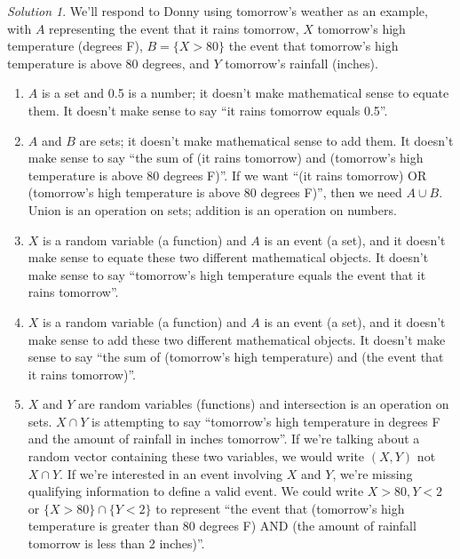 \documentclass[
  letterpaper,
  DIV=11,
  numbers=noendperiod]{scrreprt}
\providecommand{\tightlist}{%
  \setlength{\itemsep}{0pt}\setlength{\parskip}{0pt}}
\theoremstyle{plain}
\theoremstyle{definition}
\theoremstyle{definition}
\theoremstyle{definition}
\theoremstyle{remark}
\newtheorem{refsolution}{Solution}[chapter]
\begin{document}
\begin{tcolorbox}[enhanced jigsaw, opacityback=0, rightrule=.15mm, coltitle=black, colframe=quarto-callout-tip-color-frame, toprule=.15mm, colbacktitle=quarto-callout-tip-color!10!white, opacitybacktitle=0.6, left=2mm, toptitle=1mm, breakable, title={Solution (click to expand)}, bottomtitle=1mm, colback=white, leftrule=.75mm, titlerule=0mm, arc=.35mm, bottomrule=.15mm]

\begin{refsolution}
We'll respond to Donny using tomorrow's weather as an example, with
\(A\) representing the event that it rains tomorrow, \(X\) tomorrow's
high temperature (degrees F), \(B=\{X>80\}\) the event that tomorrow's
high temperature is above 80 degrees, and \(Y\) tomorrow's rainfall
(inches).

\begin{enumerate}
\def\labelenumi{\arabic{enumi}.}
\tightlist
\item
  \(A\) is a set and 0.5 is a number; it doesn't make mathematical sense
  to equate them. It doesn't make sense to say ``it rains tomorrow
  equals 0.5''.
\item
  \(A\) and \(B\) are sets; it doesn't make mathematical sense to add
  them. It doesn't make sense to say ``the sum of (it rains tomorrow)
  and (tomorrow's high temperature is above 80 degrees F)''. If we want
  ``(it rains tomorrow) OR (tomorrow's high temperature is above 80
  degrees F)'', then we need \(A\cup B\). Union is an operation on sets;
  addition is an operation on numbers.
\item
  \(X\) is a random variable (a function) and \(A\) is an event (a set),
  and it doesn't make sense to equate these two different mathematical
  objects. It doesn't make sense to say ``tomorrow's high temperature
  equals the event that it rains tomorrow''.
\item
  \(X\) is a random variable (a function) and \(A\) is an event (a set),
  and it doesn't make sense to add these two different mathematical
  objects. It doesn't make sense to say ``the sum of (tomorrow's high
  temperature) and (the event that it rains tomorrow)''.
\item
  \(X\) and \(Y\) are random variables (functions) and intersection is
  an operation on sets. \(X \cap Y\) is attempting to say ``tomorrow's
  high temperature in degrees F and the amount of rainfall in inches
  tomorrow''. If we're talking about a random vector containing these
  two variables, we would write \((X, Y)\) not \(X \cap Y\). If we're
  interested in an event involving \(X\) and \(Y\), we're missing
  qualifying information to define a valid event. We could write
  \(X >80, Y < 2\) or \(\{X > 80\} \cap \{Y < 2\}\) to represent ``the
  event that (tomorrow's high temperature is greater than 80 degrees F)
  AND (the amount of rainfall tomorrow is less than 2 inches)''.
\end{enumerate}

\label{sol-dd-events}

\end{refsolution}

\end{tcolorbox}
\end{document}
